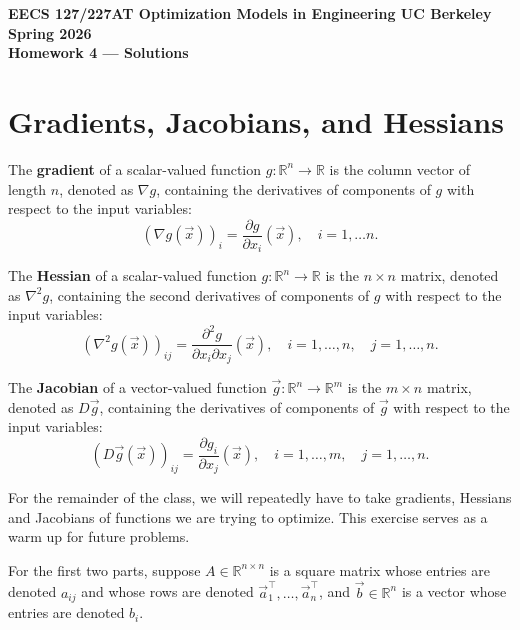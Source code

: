 \documentclass[10pt]{article}
\theoremstyle{definition}
\theoremstyle{plain}
\newcommand{\RR}{\mathbb{R}}
\begin{document}
\begin{center}
{\large\bfseries EECS 127/227AT \quad Optimization Models in Engineering \quad UC Berkeley \quad Spring 2026}\\[6pt]
{\LARGE\bfseries Homework 4 --- Solutions}
\end{center}

\medskip

\section{Gradients, Jacobians, and Hessians}

The \textbf{gradient} of a scalar-valued function $g\colon \RR^n \to \RR$ is the column vector of length $n$, denoted as $\nabla g$, containing the derivatives of components of $g$ with respect to the input variables:
\begin{equation}
(\nabla g(\vec{x}))_i = \frac{\partial g}{\partial x_i}(\vec{x}), \quad i = 1, \ldots n.
\end{equation}

The \textbf{Hessian} of a scalar-valued function $g\colon \RR^n \to \RR$ is the $n \times n$ matrix, denoted as $\nabla^2 g$, containing the second derivatives of components of $g$ with respect to the input variables:
\begin{equation}
(\nabla^2 g(\vec{x}))_{ij} = \frac{\partial^2 g}{\partial x_i \partial x_j}(\vec{x}), \quad i = 1, \ldots, n, \quad j = 1, \ldots, n.
\end{equation}

The \textbf{Jacobian} of a vector-valued function $\vec{g}\colon \RR^n \to \RR^m$ is the $m \times n$ matrix, denoted as $D\vec{g}$, containing the derivatives of components of $\vec{g}$ with respect to the input variables:
\begin{equation}
(D\vec{g}(\vec{x}))_{ij} = \frac{\partial g_i}{\partial x_j}(\vec{x}), \quad i = 1, \ldots, m, \quad j = 1, \ldots, n.
\end{equation}

For the remainder of the class, we will repeatedly have to take gradients, Hessians and Jacobians of functions we are trying to optimize. This exercise serves as a warm up for future problems.

For the first two parts, suppose $A \in \RR^{n \times n}$ is a square matrix whose entries are denoted $a_{ij}$ and whose rows are denoted $\vec{a}_1^\top, \ldots, \vec{a}_n^\top$, and $\vec{b} \in \RR^n$ is a vector whose entries are denoted $b_i$.
\end{document}
